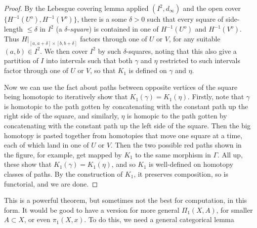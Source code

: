 \documentclass{tufte-handout}
\theoremstyle{definition}
\begin{document}
\begin{proof}
By the Lebesgue covering lemma applied $(I^2,d_\infty)$ and the open cover 
$\{H^{-1}(U^o), H^{-1}(V^o)\}$, there is a some $\delta > 0$ such that every square of 
side-length $\leq\delta$ in $I^2$ (a \emph{$\delta$-square}) is contained in one of 
$H^{-1}(U^o)$ and $H^{-1}(V^o)$. Thus $H\big|_{[a,a+\delta]\times[b,b+\delta]}$ factors 
through one of $U$ or $V$, for any suitable $(a,b)\in I^2$. We then cover $I^2$ by such 
$\delta$-squares, noting that this also give a partition of $I$ into intervals such that 
both $\gamma$ and $\eta$ restricted to such intervals factor through one of $U$ or $V$, 
so that $K_1$ is defined on $\gamma$ and $\eta$.

Now we can use the fact about paths between opposite vertices of the square 
being homotopic to iteratively 
show that $K_1(\gamma) = K_1(\eta)$. Firstly, note that $\gamma$ is homotopic to the 
path gotten by concatenating with the constant path up the right side of the square, and 
similarly, $\eta$ is homopic to the path gotten by concatenating with the constant path 
up the left side of the square. Then the big homotopy is pasted together from homotopies 
that move one square at a time, each of which land in one of $U$ or $V$. Then the two 
possible red paths shown in the figure, for example, get mapped by $K_1$ to the same morphism 
in $\Gamma$. All up, these show that $K_1(\gamma) = K_1(\eta)$, and so $K_1$ is 
well-defined on homotopy classes of paths. By the construction of $K_1$, it preserves 
composition, so is functorial, and we are done.
\end{proof}

This is a powerful theorem, but sometimes not the best for computation, in this form. It 
would be good to have a version for more general $\Pi_1(X,A)$, for smaller $A\subset X$, 
or even $\pi_1(X,x)$. To do this, we need a general categorical lemma
\end{document}
